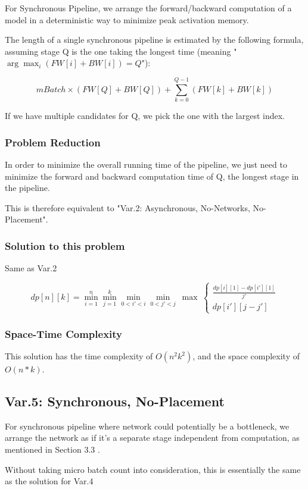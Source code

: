 \documentclass[12pt,letterpaper]{article}
\begin{document}
For Synchronous Pipeline, we arrange the forward/backward computation of a model in a deterministic way to minimize peak activation memory. 

The length of a single synchronous pipeline is estimated by the following formula, assuming stage Q is the one taking the longest time (meaning "$\arg \max_i {(FW[i] + BW[i])} = Q$"):

$$mBatch \times (FW[Q] + BW[Q]) + \sum_{k=0}^{Q-1}{(FW[k] + BW[k])} $$

If we have multiple candidates for Q, we pick the one with the largest index.

\subsubsection{Problem Reduction}
In order to minimize the overall running time of the pipeline, we just need to minimize the forward and backward computation time of Q, the longest stage in the pipeline. 

This is therefore equivalent to "Var.2: Asynchronous, No-Networks, No-Placement".

\subsubsection{Solution to this problem}
Same as Var.2

$$dp[n][k] = \min_{i=1}^n\min_{j=1}^k\min_{0<i'<i}\min_{0<j'<j}\ \max\ \left\{\begin{array}{lr}
        	\frac{dp[i][1] - dp[i'][1]}{j'} \\
        	dp[i'][j-j']
        \end{array} \right .$$

\subsubsection{Space-Time Complexity}
This solution has the time complexity of $O(n^2k^2)$, and the space complexity of $O(n * k)$.

\subsection{Var.5: Synchronous, No-Placement}
For synchronous pipeline where network could potentially be a bottleneck, we arrange the network as if it's a separate stage independent from computation, as mentioned in Section 3.3 .

Without taking micro batch count into consideration, this is essentially the same as the solution for Var.4
\end{document}

